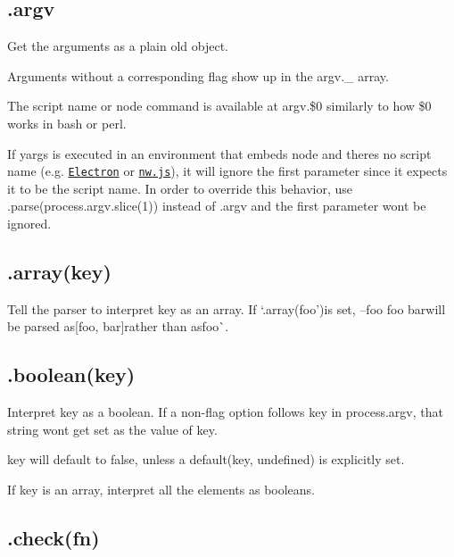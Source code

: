 \subsection*{.argv }

Get the arguments as a plain old object.

Arguments without a corresponding flag show up in the {\ttfamily argv.\+\_\+} array.

The script name or node command is available at {\ttfamily argv.\$0} similarly to how {\ttfamily \$0} works in bash or perl.

If {\ttfamily yargs} is executed in an environment that embeds node and there\textquotesingle{}s no script name (e.\+g. \href{http://electron.atom.io/}{\tt Electron} or \href{http://nwjs.io/}{\tt nw.\+js}), it will ignore the first parameter since it expects it to be the script name. In order to override this behavior, use {\ttfamily .parse(process.\+argv.\+slice(1))} instead of {\ttfamily .argv} and the first parameter won\textquotesingle{}t be ignored.

\subsection*{\label{_array}%
.array(key) }

Tell the parser to interpret {\ttfamily key} as an array. If `.array(\textquotesingle{}foo'){\ttfamily is set, }--foo foo bar{\ttfamily will be parsed as}\mbox{[}\textquotesingle{}foo\textquotesingle{}, \textquotesingle{}bar\textquotesingle{}\mbox{]}{\ttfamily rather than as}\textquotesingle{}foo\textquotesingle{}\`{}.

\subsection*{\label{_boolean}%
.boolean(key) }

Interpret {\ttfamily key} as a boolean. If a non-\/flag option follows {\ttfamily key} in {\ttfamily process.\+argv}, that string won\textquotesingle{}t get set as the value of {\ttfamily key}.

{\ttfamily key} will default to {\ttfamily false}, unless a {\ttfamily default(key, undefined)} is explicitly set.

If {\ttfamily key} is an array, interpret all the elements as booleans.

\subsection*{.check(fn) }

